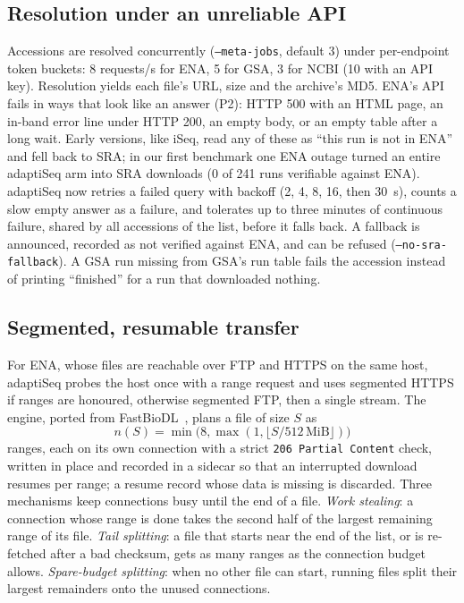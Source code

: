 \documentclass[conference]{IEEEtran}
\begin{document}
\subsection{Resolution under an unreliable API}
Accessions are resolved concurrently (\texttt{--meta-jobs}, default 3) under per-endpoint token buckets: 8 requests/s for ENA, 5 for GSA, 3 for NCBI (10 with an API key). Resolution yields each file's URL, size and the archive's MD5. ENA's API fails in ways that look like an answer (P2): HTTP 500 with an HTML page, an in-band error line under HTTP 200, an empty body, or an empty table after a long wait. Early versions, like iSeq, read any of these as ``this run is not in ENA'' and fell back to SRA; in our first benchmark one ENA outage turned an entire adaptiSeq arm into SRA downloads (0 of 241 runs verifiable against ENA). adaptiSeq now retries a failed query with backoff (2, 4, 8, 16, then 30~s), counts a slow empty answer as a failure, and tolerates up to three minutes of continuous failure, shared by all accessions of the list, before it falls back. A fallback is announced, recorded as not verified against ENA, and can be refused (\texttt{--no-sra-fallback}). A GSA run missing from GSA's run table fails the accession instead of printing ``finished'' for a run that downloaded nothing.

\subsection{Segmented, resumable transfer}
For ENA, whose files are reachable over FTP and HTTPS on the same host, adaptiSeq probes the host once with a range request and uses segmented HTTPS if ranges are honoured, otherwise segmented FTP, then a single stream. The engine, ported from FastBioDL~\cite{fastbiodl}, plans a file of size $S$ as
\[ n(S)=\min\bigl(8,\max(1,\lfloor S/512\,\mathrm{MiB}\rfloor)\bigr) \]
ranges, each on its own connection with a strict \texttt{206 Partial Content} check, written in place and recorded in a sidecar so that an interrupted download resumes per range; a resume record whose data is missing is discarded. Three mechanisms keep connections busy until the end of a file. \emph{Work stealing}: a connection whose range is done takes the second half of the largest remaining range of its file. \emph{Tail splitting}: a file that starts near the end of the list, or is re-fetched after a bad checksum, gets as many ranges as the connection budget allows. \emph{Spare-budget splitting}: when no other file can start, running files split their largest remainders onto the unused connections.
\end{document}
